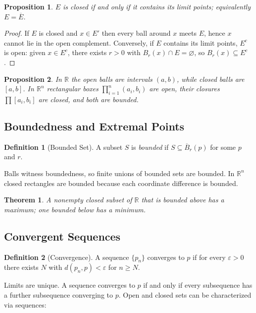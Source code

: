 \documentclass{article}
\theoremstyle{definition}
\newtheorem{definition}{Definition}[section]
\theoremstyle{plain}
\newtheorem{theorem}{Theorem}[section]
\newtheorem{proposition}{Proposition}[section]
\begin{document}
\begin{proposition}\label{prop:limits-closed}
$E$ is closed if and only if it contains its limit points; equivalently $E=\overline{E}$.
\end{proposition}
\begin{proof}
If $E$ is closed and $x\in E'$ then every ball around $x$ meets $E$, hence $x$ cannot lie in the open complement. Conversely, if $E$ contains its limit points, $E^c$ is open: given $x\in E^c$, there exists $r>0$ with $B_r(x)\cap E=\varnothing$, so $B_r(x)\subseteq E^c$.
\end{proof}

\begin{proposition}\label{prop:oscillation}
In $\mathbb{R}$ the open balls are intervals $(a,b)$, while closed balls are $[a,b]$. In $\mathbb{R}^n$ rectangular boxes $\prod_{i=1}^n (a_i,b_i)$ are open, their closures $\prod [a_i,b_i]$ are closed, and both are bounded.
\end{proposition}

	\subsection{Boundedness and Extremal Points}\label{subsec:bounded}
\begin{definition}[Bounded Set]\label{def:bounded-set}
A subset $S$ is \emph{bounded} if $S\subseteq \overline{B}_r(p)$ for some $p$ and $r$.
\end{definition}
Balls witness boundedness, so finite unions of bounded sets are bounded. In $\mathbb{R}^n$ closed rectangles are bounded because each coordinate difference is bounded.

\begin{theorem}\label{thm:closedbounded-max}
A nonempty closed subset of $\mathbb{R}$ that is bounded above has a maximum; one bounded below has a minimum.
\end{theorem}

	\subsection{Convergent Sequences}\label{subsec:metric-convergence}
\begin{definition}[Convergence]\label{def:sequence-limit}
A sequence $\{p_n\}$ converges to $p$ if for every $\varepsilon>0$ there exists $N$ with $d(p_n,p)<\varepsilon$ for $n\ge N$.
\end{definition}
Limits are unique. A sequence converges to $p$ if and only if every subsequence has a further subsequence converging to $p$. Open and closed sets can be characterized via sequences:
\end{document}
